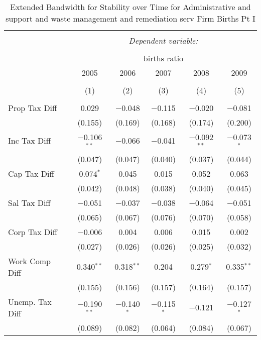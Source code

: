 
\begin{table}[!htbp] \centering 
  \caption{Extended Bandwidth for Stability over Time for  Administrative and support and waste management and remediation serv Firm Births Pt I} 
  \label{56year_eb} 
\small 
\begin{tabular}{@{\extracolsep{5pt}}lccccc} 
\\[-1.8ex]\hline 
\hline \\[-1.8ex] 
 & \multicolumn{5}{c}{\textit{Dependent variable:}} \\ 
\cline{2-6} 
\\[-1.8ex] & \multicolumn{5}{c}{births ratio} \\ 
 & 2005 & 2006 & 2007 & 2008 & 2009 \\ 
\\[-1.8ex] & (1) & (2) & (3) & (4) & (5)\\ 
\hline \\[-1.8ex] 
 Prop Tax Diff & 0.029 & $-$0.048 & $-$0.115 & $-$0.020 & $-$0.081 \\ 
  & (0.155) & (0.169) & (0.168) & (0.174) & (0.200) \\ 
  Inc Tax Diff & $-$0.106$^{**}$ & $-$0.066 & $-$0.041 & $-$0.092$^{**}$ & $-$0.073$^{*}$ \\ 
  & (0.047) & (0.047) & (0.040) & (0.037) & (0.044) \\ 
  Cap Tax Diff & 0.074$^{*}$ & 0.045 & 0.015 & 0.052 & 0.063 \\ 
  & (0.042) & (0.048) & (0.038) & (0.040) & (0.045) \\ 
  Sal Tax Diff & $-$0.051 & $-$0.037 & $-$0.038 & $-$0.064 & $-$0.051 \\ 
  & (0.065) & (0.067) & (0.076) & (0.070) & (0.058) \\ 
  Corp Tax Diff & $-$0.006 & 0.004 & 0.006 & 0.015 & 0.002 \\ 
  & (0.027) & (0.026) & (0.026) & (0.025) & (0.032) \\ 
  Work Comp Diff & 0.340$^{**}$ & 0.318$^{**}$ & 0.204 & 0.279$^{*}$ & 0.335$^{**}$ \\ 
  & (0.155) & (0.156) & (0.157) & (0.164) & (0.157) \\ 
  Unemp. Tax Diff & $-$0.190$^{**}$ & $-$0.140$^{*}$ & $-$0.115$^{*}$ & $-$0.121 & $-$0.127$^{*}$ \\ 
  & (0.089) & (0.082) & (0.064) & (0.084) & (0.067) \\ 

\end{tabular}
\end{table}
